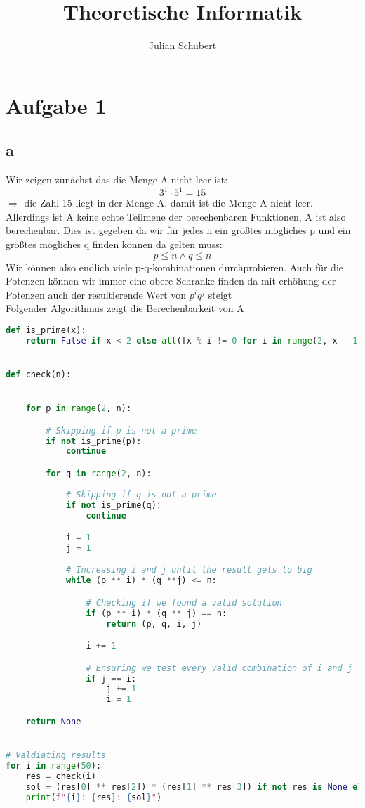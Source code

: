 \documentclass[14pt]{article}
\title{Theoretische Informatik}
\author{Julian Schubert}
\begin{document}
\section*{Aufgabe 1}
\subsection*{a}
Wir zeigen zunächst das die Menge A nicht leer ist: \\
\[
    3^1 \cdot 5^1 = 15  
\]
$\Rightarrow$ die Zahl 15 liegt in der Menge A, damit ist die
Menge A nicht leer. \\
Allerdings ist A keine echte Teilmene der berechenbaren Funktionen, A
ist also berechenbar. Dies ist gegeben da wir für jedes n ein größtes
mögliches p und ein größtes mögliches q finden können da gelten muss: \\
\[
    p \leq n \land q \leq n  
\]
Wir können also endlich viele p-q-kombinationen durchprobieren. Auch 
für die Potenzen können wir immer eine obere Schranke finden da mit 
erhöhung der Potenzen auch der resultierende Wert von $p^iq^j$ steigt \\
Folgender Algorithmus zeigt die Berechenbarkeit von A
\begin{lstlisting}[language=Python]
def is_prime(x):
    return False if x < 2 else all([x % i != 0 for i in range(2, x - 1)])


def check(n):


    for p in range(2, n):

        # Skipping if p is not a prime
        if not is_prime(p):
            continue

        for q in range(2, n):
            
            # Skipping if q is not a prime
            if not is_prime(q):
                continue

            i = 1  
            j = 1

            # Increasing i and j until the result gets to big
            while (p ** i) * (q **j) <= n:

                # Checking if we found a valid solution
                if (p ** i) * (q ** j) == n:
                    return (p, q, i, j)  

                i += 1

                # Ensuring we test every valid combination of i and j
                if j == i:
                    j += 1
                    i = 1

    return None


# Valdiating results
for i in range(50):
    res = check(i)
    sol = (res[0] ** res[2]) * (res[1] ** res[3]) if not res is None else ""
    print(f"{i}: {res}: {sol}")
\end{lstlisting}
\end{document}
